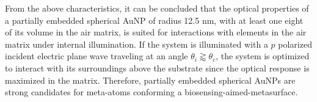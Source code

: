 From the above characteristics, it can be concluded that the optical properties of a partially embedded spherical AuNP of radius 12.5 nm, with at least one eight of its volume in the air matrix, is suited for interactions with elements in the air matrix under internal illumination. If the system is illuminated with a $p$ polarized incident electric plane wave traveling at an angle  $\theta_i \gtrapprox \theta_c$, the system is optimized to interact with its surroundings above the substrate since the optical response is maximized in the matrix. Therefore, partially embedded spherical AuNPs are strong candidates for meta-atoms conforming a biosensing-aimed-metasurface.



































